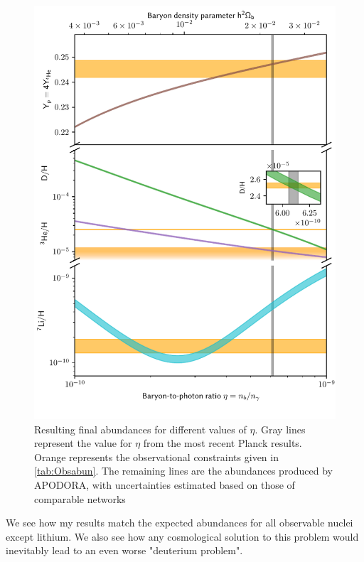 \begin{figure}[ht]
    \includegraphics[width=5.1in]{figures/etaplot.pdf}
    \caption{Resulting final abundances for different values of $\eta$. Gray lines represent the value for $\eta$ from the most recent Planck results\cite{Planck}. Orange represents the observational constraints given in \cref{tab:Obsabun}. The remaining lines are the abundances produced by APODORA, with uncertainties estimated based on those of comparable networks}
    \label{fig:etaplot}
\end{figure}

We see how my results match the expected abundances for all observable nuclei except lithium. We also see how any cosmological solution to this problem would inevitably lead to an even worse "deuterium problem". 
\clearpage

